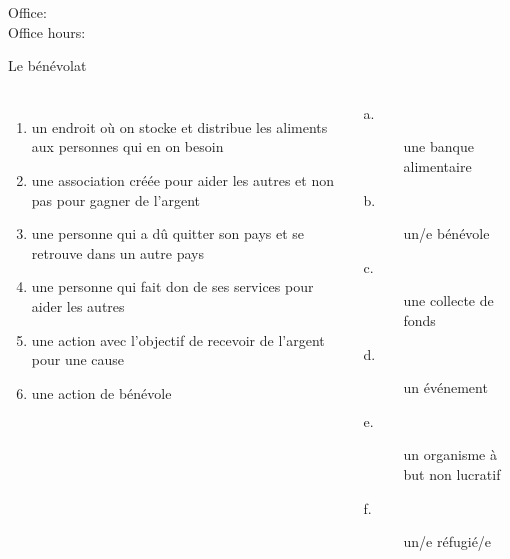 \documentclass{beamer}
\subtitle[Solidarité et subjonctif]{La solidarité et... le subjonctif!}
\begin{document}
  \begin{frame}
    \titlepage
    \tiny{Office: \\
          Office hours: }
  \end{frame}

  \begin{frame}{Le bénévolat}
    \begin{columns}
        \begin{enumerate}
          \item \underline{} un endroit où on stocke et distribue les aliments aux personnes qui en on besoin
          \item \underline{} une association créée pour aider les autres et non pas pour gagner de l'argent
          \item \underline{} une personne qui a dû quitter son pays et se retrouve dans un autre pays
          \item \underline{} une personne qui fait don de ses services pour aider les autres
          \item \underline{} une action avec l'objectif de recevoir de l'argent pour une cause
          \item \underline{} une action de bénévole
        \end{enumerate}
        \begin{description}
          \item[a.] une banque alimentaire
          \item[b.] un/e bénévole
          \item[c.] une collecte de fonds
          \item[d.] un événement
          \item[e.] un organisme à but non lucratif
          \item[f.] un/e réfugié/e
        \end{description}
    \end{columns}
  \end{frame}
\end{document}
